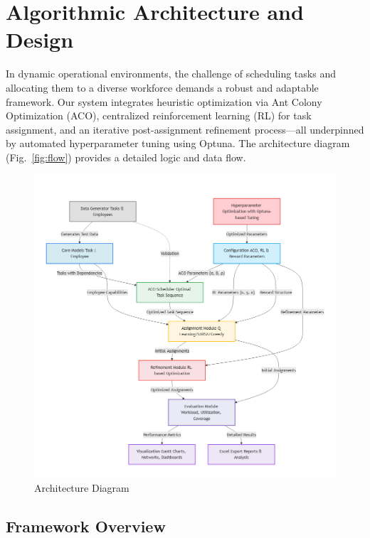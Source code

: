 \documentclass[%
aip,
cp,  %
reprint
]{revtex4-2}
\begin{document}
	\section{\label{sec:algo}Algorithmic Architecture and Design}
	
	In dynamic operational environments, the challenge of scheduling tasks and allocating them to a diverse workforce demands a robust and adaptable framework. Our system integrates heuristic optimization via Ant Colony Optimization (ACO), centralized reinforcement learning (RL) for task assignment, and an iterative post-assignment refinement process—all underpinned by automated hyperparameter tuning using Optuna. The architecture diagram (Fig.~\ref{fig:flow}) provides a detailed logic and data flow.
	
	\begin{figure}[!hb]
		\centering
		\includegraphics[width=1\linewidth]{figures/overall_architecture.png}
		\caption{\label{fig:arch}Architecture Diagram}
	\end{figure}
	
	\subsection{\label{subsec:framework}Framework Overview}
	
\end{document}
